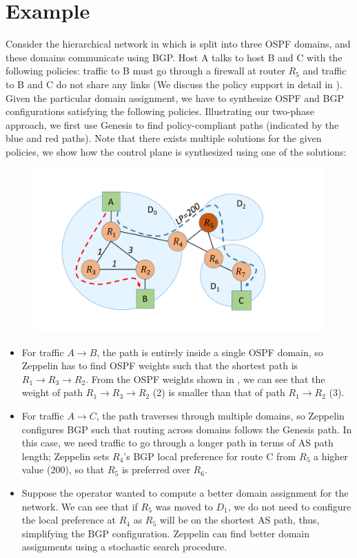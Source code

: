 \section{Example}
Consider the hierarchical network in  which
is split into three OSPF domains, and these domains communicate
using BGP. Host A talks to host B and C with the following policies:
traffic to B must go through a firewall at router $R_5$ and traffic 
to B and C do not share any links (We discuss the policy support in
detail in ). Given the particular domain assignment, 
we have to synthesize OSPF and BGP configurations satisfying the 
following policies. Illustrating our two-phase approach, we first 
use Genesis to find policy-compliant paths (indicated by the blue and
red paths). Note that there exists multiple solutions for the given
policies, we show how the control plane is 
synthesized using one of the solutions:
\begin{figure}
	\includegraphics[width=0.75\columnwidth]{figures/example.pdf}
	\label{fig:example}
\end{figure}

\begin{itemize}
	\item
For traffic $A \rightarrow B$, the path is entirely inside
a single OSPF domain, so Zeppelin has to find OSPF weights 
such that the shortest path is $R_1 \rightarrow R_3 \rightarrow 
R_2$. From the OSPF weights shown in , 
we can see that the weight of path $R_1 
\rightarrow R_3 \rightarrow R_2$ (2) is smaller than that of path
$R_1 \rightarrow R_2$ (3). 
 	\item For traffic $A \rightarrow C$, the path traverses through 
 	multiple domains, so Zeppelin configures BGP such that 
 	routing across domains follows the Genesis path. In this case, 
 	we need traffic to go through a longer path in terms of AS path
 	length; Zeppelin sets $R_4$'s BGP local preference for route C
 	from $R_5$ a higher value (200), so that $R_5$ is 
 	preferred over $R_6$. 
 	\item Suppose the operator wanted to compute a better domain
 	assignment for the network. We can see that if $R_5$ was moved
 	to $D_1$, we do not need to configure the local preference 
 	at $R_4$ as $R_5$ will be on the shortest AS path, 
 	thus, simplifying the BGP configuration. 
 	Zeppelin can find better domain assignments using a stochastic
 	search procedure. 
\end{itemize}